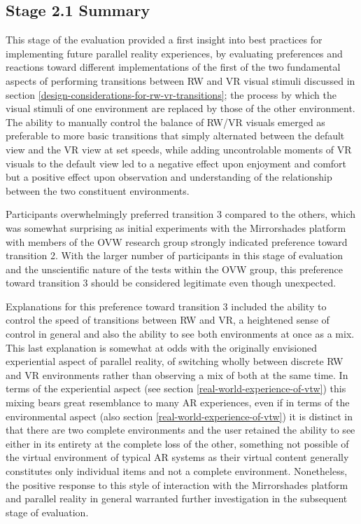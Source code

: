 
\subsection{Stage 2.1 Summary}

This stage of the evaluation provided a first insight into best practices for implementing future parallel reality experiences, by evaluating preferences and reactions toward different implementations of the first of the two fundamental aspects of performing transitions between RW and VR visual stimuli discussed in section \ref{design-considerations-for-rw-vr-transitions}; the process by which the visual stimuli of one environment are replaced by those of the other environment. The ability to manually control the balance of RW/VR visuals emerged as preferable to more basic transitions that simply alternated between the default view and the VR view at set speeds, while adding uncontrolable moments of VR visuals to the default view led to a negative effect upon enjoyment and comfort but a positive effect upon observation and understanding of the relationship between the two constituent environments.

Participants overwhelmingly preferred transition 3 compared to the others, which was somewhat surprising as initial experiments with the Mirrorshades platform with members of the OVW research group strongly indicated preference toward transition 2. With the larger number of participants in this stage of evaluation and the unscientific nature of the tests within the OVW group, this preference toward transition 3 should be considered legitimate even though unexpected.

Explanations for this preference toward transition 3 included the ability to control the speed of transitions between RW and VR, a heightened sense of control in general and also the ability to see both environments at once as a mix. This last explanation is somewhat at odds with the originally envisioned experiential aspect of parallel reality, of switching wholly between discrete RW and VR environments rather than observing a mix of both at the same time. In terms of the experiential aspect (see section \ref{real-world-experience-of-vtw}) this mixing bears great resemblance to many AR experiences, even if in terms of the environmental aspect (also section \ref{real-world-experience-of-vtw}) it is distinct in that there are two complete environments and the user retained the ability to see either in its entirety at the complete loss of the other, something not possible of the virtual environment of typical AR systems as their virtual content generally constitutes only individual items and not a complete environment. Nonetheless, the positive response to this style of interaction with the Mirrorshades platform and parallel reality in general warranted further investigation in the subsequent stage of evaluation.

